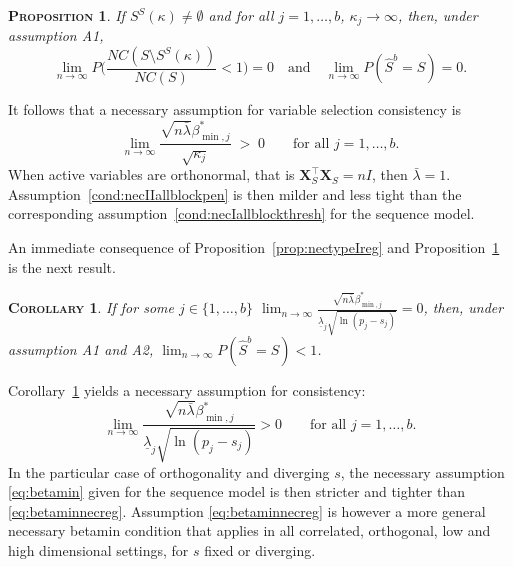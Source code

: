 \documentclass[aos]{imsart}
\theoremstyle{plain}
\newtheorem{prop}[thm]{\textsc{Proposition}}
\newtheorem{cor}[thm]{\textsc{Corollary}}
\newcommand{\paul}[1]{{\small{\color{green} \sf $\spadesuit$ Paul: #1}}}
\newcommand{\bs}{\boldsymbol}
\begin{document}
\begin{prop}\label{prop:nectypeIIreg}
    If $S^{S}(\kappa)\neq\emptyset$ and for all $j=1,\ldots,b$, $\kappa_j\to \infty$, then, under assumption A1, 
    $$\lim_{n \to \infty} P\Big(\frac{NC(S\setminus S^{S}(\kappa))}{NC(S)}<1\Big)= 0 \quad\text{and}\quad \lim_{n \to \infty} P(\hat{S}^b=S)= 0.$$
\end{prop}
It follows that a necessary assumption for variable selection consistency is
\begin{equation}\label{cond:necIIallblockpen}
\lim_{n\to\infty}\frac{\sqrt{n\bar{\lambda}}\beta_{\min,j}^*}{\sqrt{\kappa_j}}\;>\;0\qquad\mbox{for all }j=1,\ldots,b.
\end{equation}
When active variables are orthonormal, %
that is $\bs X_S^{\top}\bs X_S = nI$, then $\bar{\lambda}=1$. 
Assumption~\eqref{cond:necIIallblockpen} is then milder and less tight than the corresponding assumption~\eqref{cond:necIallblockthresh} for the sequence model. 

An immediate consequence of Proposition~\ref{prop:nectypeIreg} and Proposition~\ref{prop:nectypeIIreg} is the next result.
\begin{cor}\label{cor:necrecovreg}
    If for some $j\in\{1,\ldots,b\}$   $\lim_{n\to\infty}\frac{\sqrt{n\bar{\lambda}}\beta_{\min,j}^*}{\underline{\lambda}_j\sqrt{\ln(p_j-s_j)}} = 0$, then, under assumption A1 and A2,  $\lim_{n \to \infty} P(\hat{S}^b=S) < 1$.
\end{cor}
Corollary~\ref{cor:necrecovreg} yields a necessary assumption for consistency:
\begin{equation}\label{eq:betaminnecreg}
\lim_{n\to\infty}\frac{\sqrt{n\bar{\lambda}}\beta_{\min,j}^*}{\underline{\lambda}_j\sqrt{\ln(p_j-s_j)}} > 0\qquad\mbox{for all }j=1,\ldots,b.
\end{equation}
In the particular case of orthogonality and diverging $s$, the necessary assumption \eqref{eq:betamin} given for the sequence model is then stricter and tighter than \eqref{eq:betaminnecreg}. Assumption \eqref{eq:betaminnecreg} is however a more general necessary betamin condition that applies in all correlated, orthogonal, low and high dimensional settings, for $s$ fixed or diverging. %
\end{document}

